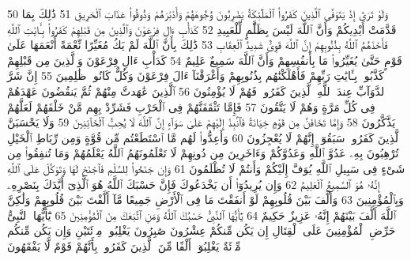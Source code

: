 {\tiny\colorbox{cl_aya}{50}} وَلَوْ تَرَىٰٓ إِذْ يَتَوَفَّى ٱلَّذِينَ كَفَرُوا۟ ٱلْمَلَٰٓئِكَةُ يَضْرِبُونَ وُجُوهَهُمْ وَأَدْبَٰرَهُمْ وَذُوقُوا۟ عَذَابَ ٱلْحَرِيقِ
{\tiny\colorbox{cl_aya}{51}} ذَٰلِكَ بِمَا قَدَّمَتْ أَيْدِيكُمْ وَأَنَّ ٱللَّهَ لَيْسَ بِظَلَّٰمٍ لِّلْعَبِيدِ
{\tiny\colorbox{cl_aya}{52}} كَدَأْبِ ءَالِ فِرْعَوْنَ وَٱلَّذِينَ مِن قَبْلِهِمْ كَفَرُوا۟ بِـَٔايَٰتِ ٱللَّهِ فَأَخَذَهُمُ ٱللَّهُ بِذُنُوبِهِمْ إِنَّ ٱللَّهَ قَوِىٌّ شَدِيدُ ٱلْعِقَابِ
{\tiny\colorbox{cl_aya}{53}} ذَٰلِكَ بِأَنَّ ٱللَّهَ لَمْ يَكُ مُغَيِّرًا نِّعْمَةً أَنْعَمَهَا عَلَىٰ قَوْمٍ حَتَّىٰ يُغَيِّرُوا۟ مَا بِأَنفُسِهِمْ وَأَنَّ ٱللَّهَ سَمِيعٌ عَلِيمٌ
{\tiny\colorbox{cl_aya}{54}} كَدَأْبِ ءَالِ فِرْعَوْنَ وَٱلَّذِينَ مِن قَبْلِهِمْ كَذَّبُوا۟ بِـَٔايَٰتِ رَبِّهِمْ فَأَهْلَكْنَٰهُم بِذُنُوبِهِمْ وَأَغْرَقْنَآ ءَالَ فِرْعَوْنَ وَكُلٌّ كَانُوا۟ ظَٰلِمِينَ
{\tiny\colorbox{cl_aya}{55}} إِنَّ شَرَّ ٱلدَّوَآبِّ عِندَ ٱللَّهِ ٱلَّذِينَ كَفَرُوا۟ فَهُمْ لَا يُؤْمِنُونَ
{\tiny\colorbox{cl_aya}{56}} ٱلَّذِينَ عَٰهَدتَّ مِنْهُمْ ثُمَّ يَنقُضُونَ عَهْدَهُمْ فِى كُلِّ مَرَّةٍ وَهُمْ لَا يَتَّقُونَ
{\tiny\colorbox{cl_aya}{57}} فَإِمَّا تَثْقَفَنَّهُمْ فِى ٱلْحَرْبِ فَشَرِّدْ بِهِم مَّنْ خَلْفَهُمْ لَعَلَّهُمْ يَذَّكَّرُونَ
{\tiny\colorbox{cl_aya}{58}} وَإِمَّا تَخَافَنَّ مِن قَوْمٍ خِيَانَةً فَٱنۢبِذْ إِلَيْهِمْ عَلَىٰ سَوَآءٍ إِنَّ ٱللَّهَ لَا يُحِبُّ ٱلْخَآئِنِينَ
{\tiny\colorbox{cl_aya}{59}} وَلَا يَحْسَبَنَّ ٱلَّذِينَ كَفَرُوا۟ سَبَقُوٓا۟ إِنَّهُمْ لَا يُعْجِزُونَ
{\tiny\colorbox{cl_aya}{60}} وَأَعِدُّوا۟ لَهُم مَّا ٱسْتَطَعْتُم مِّن قُوَّةٍ وَمِن رِّبَاطِ ٱلْخَيْلِ تُرْهِبُونَ بِهِۦ عَدُوَّ ٱللَّهِ وَعَدُوَّكُمْ وَءَاخَرِينَ مِن دُونِهِمْ لَا تَعْلَمُونَهُمُ ٱللَّهُ يَعْلَمُهُمْ وَمَا تُنفِقُوا۟ مِن شَىْءٍ فِى سَبِيلِ ٱللَّهِ يُوَفَّ إِلَيْكُمْ وَأَنتُمْ لَا تُظْلَمُونَ
{\tiny\colorbox{cl_aya}{61}} وَإِن جَنَحُوا۟ لِلسَّلْمِ فَٱجْنَحْ لَهَا وَتَوَكَّلْ عَلَى ٱللَّهِ إِنَّهُۥ هُوَ ٱلسَّمِيعُ ٱلْعَلِيمُ
{\tiny\colorbox{cl_aya}{62}} وَإِن يُرِيدُوٓا۟ أَن يَخْدَعُوكَ فَإِنَّ حَسْبَكَ ٱللَّهُ هُوَ ٱلَّذِىٓ أَيَّدَكَ بِنَصْرِهِۦ وَبِٱلْمُؤْمِنِينَ
{\tiny\colorbox{cl_aya}{63}} وَأَلَّفَ بَيْنَ قُلُوبِهِمْ لَوْ أَنفَقْتَ مَا فِى ٱلْأَرْضِ جَمِيعًا مَّآ أَلَّفْتَ بَيْنَ قُلُوبِهِمْ وَلَٰكِنَّ ٱللَّهَ أَلَّفَ بَيْنَهُمْ إِنَّهُۥ عَزِيزٌ حَكِيمٌ
{\tiny\colorbox{cl_aya}{64}} يَٰٓأَيُّهَا ٱلنَّبِىُّ حَسْبُكَ ٱللَّهُ وَمَنِ ٱتَّبَعَكَ مِنَ ٱلْمُؤْمِنِينَ
{\tiny\colorbox{cl_aya}{65}} يَٰٓأَيُّهَا ٱلنَّبِىُّ حَرِّضِ ٱلْمُؤْمِنِينَ عَلَى ٱلْقِتَالِ إِن يَكُن مِّنكُمْ عِشْرُونَ صَٰبِرُونَ يَغْلِبُوا۟ مِا۟ئَتَيْنِ وَإِن يَكُن مِّنكُم مِّا۟ئَةٌ يَغْلِبُوٓا۟ أَلْفًا مِّنَ ٱلَّذِينَ كَفَرُوا۟ بِأَنَّهُمْ قَوْمٌ لَّا يَفْقَهُونَ

